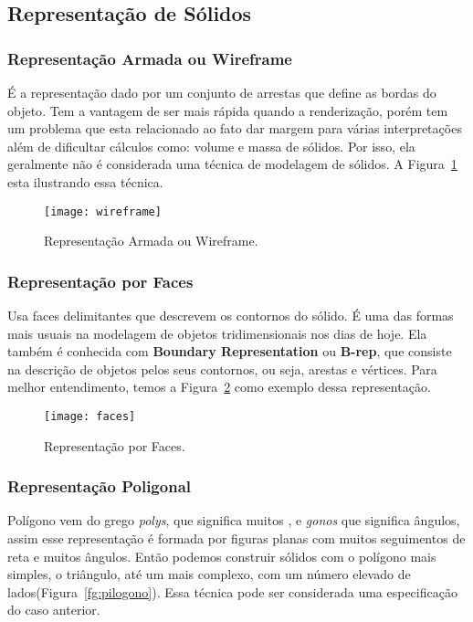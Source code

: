 \subsection{Representação de Sólidos}
\subsubsection{Representação Armada ou Wireframe}
É a representação dado por um conjunto de arrestas que define as bordas do objeto\cite{speck}. Tem a vantagem de ser mais rápida quando a renderização, porém tem um problema que esta relacionado ao fato dar margem para várias interpretações além de dificultar cálculos como: volume e massa de sólidos. Por isso, ela geralmente não é considerada uma técnica de modelagem de sólidos. A Figura~\ref{fg:wireframe} esta ilustrando essa técnica.

\begin{figure}[ht!]
      \centering
	  \texttt{[image: wireframe]}
	  \caption{Representação Armada ou Wireframe.}
	  \label{fg:wireframe}
\end{figure} 

\subsubsection{Representação por Faces} 
Usa faces delimitantes que descrevem os contornos do sólido. É uma das formas mais usuais na modelagem de objetos tridimensionais nos dias de hoje. Ela  também é conhecida com  \textbf{Boundary Representation} ou \textbf{B-rep}, que consiste na descrição de  objetos pelos seus contornos, ou seja, arestas e vértices. Para melhor entendimento, temos a Figura~\ref{fg:faces} como exemplo dessa representação.

\begin{figure}[ht!]
      \centering
	  \texttt{[image: faces]}
	  \caption{Representação por Faces.}
	  \label{fg:faces}
\end{figure} 

\subsubsection{Representação Poligonal}
Polígono vem do grego \textit{polys}, que significa muitos , e \textit{gonos} que significa ângulos, assim esse representação é formada por figuras planas com muitos seguimentos de reta e muitos ângulos. Então podemos construir sólidos com o polígono mais  simples, o triângulo, até um mais complexo, com um número elevado de lados(Figura~\ref{fg:pilogono}). Essa técnica pode ser considerada uma especificação do caso anterior.\\

